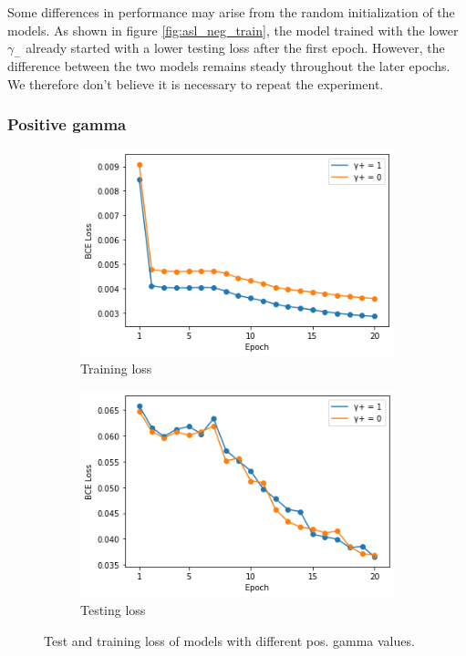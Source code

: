 Some differences in performance may arise from the random initialization of the models. As shown in figure \ref{fig:asl_neg_train}, the model trained with the lower $\gamma_-$ already started with a lower testing loss after the first epoch. However, the difference between the two models remains steady throughout the later epochs. We therefore don't believe it is necessary to repeat the experiment.

\subsubsection{Positive gamma}

\begin{figure}
  \begin{subfigure}[t]{.5\textwidth}
    \centering
    \includegraphics[width=\textwidth]{figures/supervised_approach/asl_pos_train_loss.png}
    \caption{Training loss}
    \label{fig:asl_pos_train_loss}
  \end{subfigure}
   \begin{subfigure}[t]{.5\textwidth}
    \centering
    \includegraphics[width=\textwidth]{figures/supervised_approach/asl_pos_test_loss.png}
    \caption{Testing loss}
    \label{fig:asl_pos_test_loss}
  \end{subfigure}
  \caption{Test and training loss of models with different pos. gamma values.}
  \label{fig:asl_pos_train}
\end{figure}


